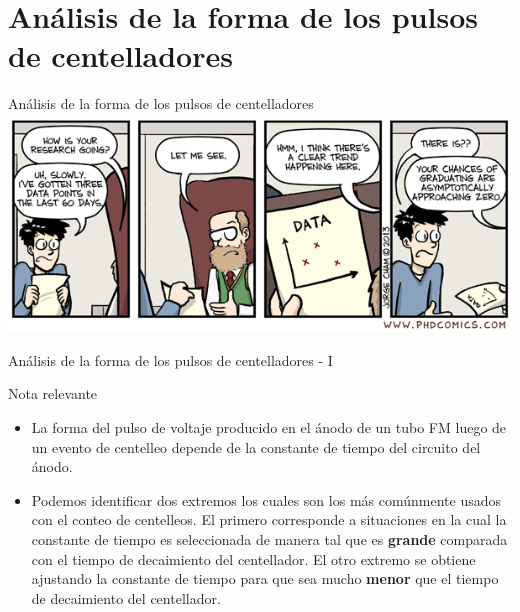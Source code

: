 \documentclass[a4paper,10pt]{beamer}
\begin{document}
\section{Análisis de la forma de los pulsos de centelladores}
\begin{frame}
\begin{center}
 {\Huge{\color{blue}Análisis de la forma de los pulsos de centelladores}} \\
 \vspace{0.5cm}
 \includegraphics[scale=0.5]{fig43}
\end{center}
\end{frame}

\begin{frame}{Análisis de la forma de los pulsos de centelladores - I}
 
 \begin{block}{Nota relevante}
  \begin{itemize}[<+->]
   \item \begin{justify}
          La forma del pulso de voltaje producido en el ánodo de un tubo FM luego de 
          un evento de centelleo depende de la constante de tiempo del circuito del 
          ánodo.
         \end{justify}
  \item \begin{justify}
         Podemos identificar dos extremos los cuales son los más comúnmente usados 
         con el conteo de centelleos. El primero corresponde a situaciones en la 
         cual la constante de tiempo es seleccionada de manera tal que es \textbf{grande} 
         comparada con el tiempo de decaimiento del centellador. El otro extremo 
         se obtiene ajustando la constante de tiempo para que sea mucho \textbf{menor} 
         que el tiempo de decaimiento del centellador.
        \end{justify}

  \end{itemize}

 \end{block}
\end{frame}
\end{document}
